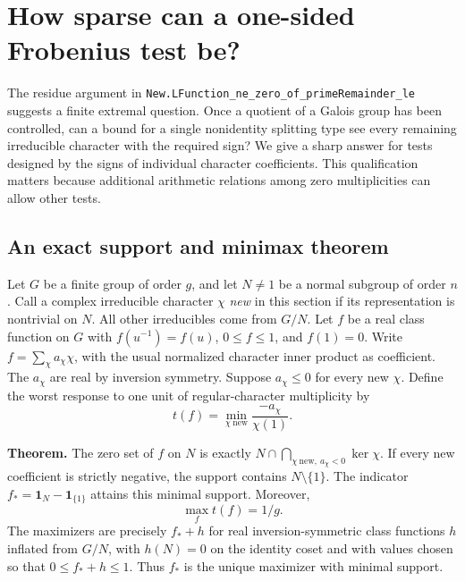 \section{How sparse can a one-sided Frobenius test be?}
\label{sec:transfer}
The residue argument in
\texttt{New.LFunction\_ne\_zero\_of\_primeRemainder\_le} suggests a
finite extremal question. Once a quotient of a Galois group has been
controlled, can a bound for a single nonidentity splitting type see
every remaining irreducible character with the required sign? We give
a sharp answer for tests designed by the signs of individual character
coefficients. This qualification matters because additional arithmetic
relations among zero multiplicities can allow other tests.

\subsection*{An exact support and minimax theorem}
Let $G$ be a finite group of order $g$, and let $N\ne1$ be a normal
subgroup of order $n$. Call a complex irreducible character
$\chi$ \emph{new} in this section if its representation is nontrivial
on $N$. All other irreducibles come from $G/N$. Let $f$ be a real
class function on $G$ with $f(u^{-1})=f(u)$, $0\le f\le 1$, and $f(1)=0$.
Write $f=\sum_\chi a_\chi\chi$, with the usual normalized character
inner product as coefficient. The $a_\chi$ are real by inversion
symmetry. Suppose $a_\chi\le0$ for every new $\chi$.
Define the worst response to one unit of regular-character multiplicity by
\[
  t(f)=\min_{\chi\ \mathrm{new}}\frac{-a_\chi}{\chi(1)}.
\]

\noindent\textbf{Theorem.}
The zero set of $f$ on $N$ is exactly
$N\cap\bigcap_{\chi\ \mathrm{new},\ a_\chi<0}\ker\chi$.
If every new coefficient is strictly negative, the support contains
$N\setminus\{1\}$. The indicator
$f_*=\mathbf 1_N-\mathbf 1_{\{1\}}$ attains this minimal support.
Moreover,
\[
                      \max_f t(f)=1/g.
\]
The maximizers are precisely $f_*+h$ for real inversion-symmetric
class functions $h$ inflated from $G/N$, with $h(N)=0$ on the identity
coset and with values chosen so that $0\le f_*+h\le1$.
Thus $f_*$ is the unique maximizer with minimal support.

